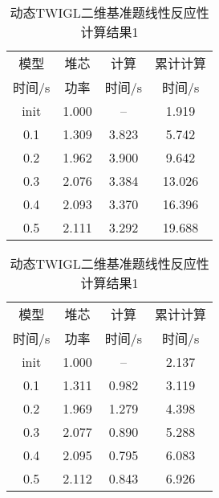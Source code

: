 
\begin{table}
\centering
\caption{动态TWIGL二维基准题线性反应性计算结果1\label{tab:testresult.twigl.2.1-2}}
{
\small
\begin{tabular}{cccc}
\toprule
模型 & 堆芯 & 计算 & 累计计算\\
时间/s & 功率 & 时间/s & 时间/s\\
\midrule
init & 1.000 & -- & 1.919\\
0.1 & 1.309 & 3.823 & 5.742\\
0.2 & 1.962 & 3.900 & 9.642\\
0.3 & 2.076 & 3.384 & 13.026\\
0.4 & 2.093 & 3.370 & 16.396\\
0.5 & 2.111 & 3.292 & 19.688\\
\bottomrule
\end{tabular}
}
{
\small
\begin{tabular}{cccc}
\toprule
模型 & 堆芯 & 计算 & 累计计算\\
时间/s & 功率 & 时间/s & 时间/s\\
\midrule
init & 1.000 & -- & 2.137\\
0.1 & 1.311 & 0.982 & 3.119\\
0.2 & 1.969 & 1.279 & 4.398\\
0.3 & 2.077 & 0.890 & 5.288\\
0.4 & 2.095 & 0.795 & 6.083\\
0.5 & 2.112 & 0.843 & 6.926\\
\bottomrule
\end{tabular}
}


\end{table}
